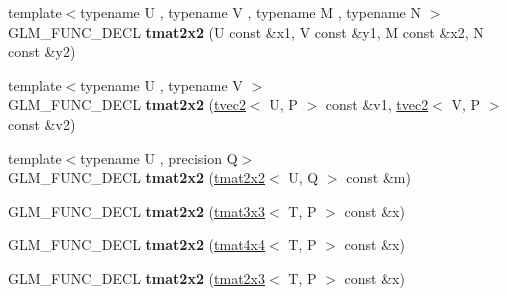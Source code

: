 \begin{DoxyCompactItemize}
\item 
{\footnotesize template$<$typename U , typename V , typename M , typename N $>$ }\\G\+L\+M\+\_\+\+F\+U\+N\+C\+\_\+\+D\+E\+CL {\bfseries tmat2x2} (U const \&x1, V const \&y1, M const \&x2, N const \&y2)\hypertarget{structglm_1_1detail_1_1tmat2x2_adef8daef1582260e30e727f31ec58fc4}{}\label{structglm_1_1detail_1_1tmat2x2_adef8daef1582260e30e727f31ec58fc4}

\item 
{\footnotesize template$<$typename U , typename V $>$ }\\G\+L\+M\+\_\+\+F\+U\+N\+C\+\_\+\+D\+E\+CL {\bfseries tmat2x2} (\hyperlink{structglm_1_1detail_1_1tvec2}{tvec2}$<$ U, P $>$ const \&v1, \hyperlink{structglm_1_1detail_1_1tvec2}{tvec2}$<$ V, P $>$ const \&v2)\hypertarget{structglm_1_1detail_1_1tmat2x2_a09f5f84943ae5636f82d1483cc815ef3}{}\label{structglm_1_1detail_1_1tmat2x2_a09f5f84943ae5636f82d1483cc815ef3}

\item 
{\footnotesize template$<$typename U , precision Q$>$ }\\G\+L\+M\+\_\+\+F\+U\+N\+C\+\_\+\+D\+E\+CL {\bfseries tmat2x2} (\hyperlink{structglm_1_1detail_1_1tmat2x2}{tmat2x2}$<$ U, Q $>$ const \&m)\hypertarget{structglm_1_1detail_1_1tmat2x2_a6a9b44f5626983a1f66171f8cecfbc8f}{}\label{structglm_1_1detail_1_1tmat2x2_a6a9b44f5626983a1f66171f8cecfbc8f}

\item 
G\+L\+M\+\_\+\+F\+U\+N\+C\+\_\+\+D\+E\+CL {\bfseries tmat2x2} (\hyperlink{structglm_1_1detail_1_1tmat3x3}{tmat3x3}$<$ T, P $>$ const \&x)\hypertarget{structglm_1_1detail_1_1tmat2x2_a291750bdcaf39932f079105ca4dd6633}{}\label{structglm_1_1detail_1_1tmat2x2_a291750bdcaf39932f079105ca4dd6633}

\item 
G\+L\+M\+\_\+\+F\+U\+N\+C\+\_\+\+D\+E\+CL {\bfseries tmat2x2} (\hyperlink{structglm_1_1detail_1_1tmat4x4}{tmat4x4}$<$ T, P $>$ const \&x)\hypertarget{structglm_1_1detail_1_1tmat2x2_ad46d070d32a5455eddf99fea687b488d}{}\label{structglm_1_1detail_1_1tmat2x2_ad46d070d32a5455eddf99fea687b488d}

\item 
G\+L\+M\+\_\+\+F\+U\+N\+C\+\_\+\+D\+E\+CL {\bfseries tmat2x2} (\hyperlink{structglm_1_1detail_1_1tmat2x3}{tmat2x3}$<$ T, P $>$ const \&x)\hypertarget{structglm_1_1detail_1_1tmat2x2_abe06c612421c4e601074d1e66772ae6a}{}\label{structglm_1_1detail_1_1tmat2x2_abe06c612421c4e601074d1e66772ae6a}


\end{DoxyCompactItemize}
